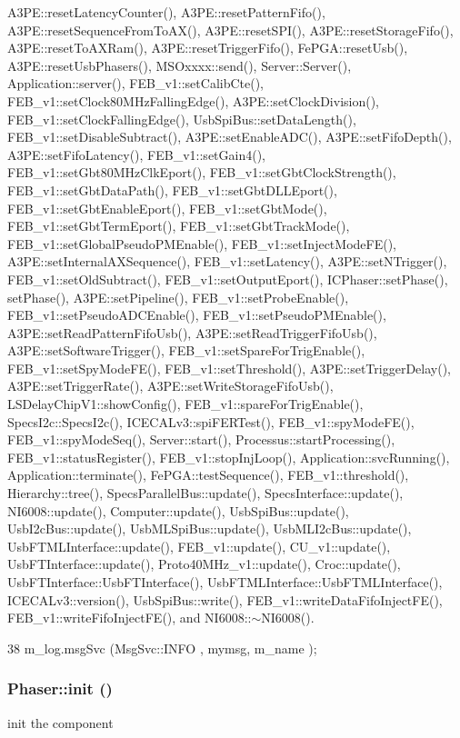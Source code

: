 A3PE::resetLatencyCounter(), A3PE::resetPatternFifo(), A3PE::resetSequenceFromToAX(), A3PE::resetSPI(), A3PE::resetStorageFifo(), A3PE::resetToAXRam(), A3PE::resetTriggerFifo(), FePGA::resetUsb(), A3PE::resetUsbPhasers(), MSOxxxx::send(), Server::Server(), Application::server(), FEB\_\-v1::setCalibCte(), FEB\_\-v1::setClock80MHzFallingEdge(), A3PE::setClockDivision(), FEB\_\-v1::setClockFallingEdge(), UsbSpiBus::setDataLength(), FEB\_\-v1::setDisableSubtract(), A3PE::setEnableADC(), A3PE::setFifoDepth(), A3PE::setFifoLatency(), FEB\_\-v1::setGain4(), FEB\_\-v1::setGbt80MHzClkEport(), FEB\_\-v1::setGbtClockStrength(), FEB\_\-v1::setGbtDataPath(), FEB\_\-v1::setGbtDLLEport(), FEB\_\-v1::setGbtEnableEport(), FEB\_\-v1::setGbtMode(), FEB\_\-v1::setGbtTermEport(), FEB\_\-v1::setGbtTrackMode(), FEB\_\-v1::setGlobalPseudoPMEnable(), FEB\_\-v1::setInjectModeFE(), A3PE::setInternalAXSequence(), FEB\_\-v1::setLatency(), A3PE::setNTrigger(), FEB\_\-v1::setOldSubtract(), FEB\_\-v1::setOutputEport(), ICPhaser::setPhase(), setPhase(), A3PE::setPipeline(), FEB\_\-v1::setProbeEnable(), FEB\_\-v1::setPseudoADCEnable(), FEB\_\-v1::setPseudoPMEnable(), A3PE::setReadPatternFifoUsb(), A3PE::setReadTriggerFifoUsb(), A3PE::setSoftwareTrigger(), FEB\_\-v1::setSpareForTrigEnable(), FEB\_\-v1::setSpyModeFE(), FEB\_\-v1::setThreshold(), A3PE::setTriggerDelay(), A3PE::setTriggerRate(), A3PE::setWriteStorageFifoUsb(), LSDelayChipV1::showConfig(), FEB\_\-v1::spareForTrigEnable(), SpecsI2c::SpecsI2c(), ICECALv3::spiFERTest(), FEB\_\-v1::spyModeFE(), FEB\_\-v1::spyModeSeq(), Server::start(), Processus::startProcessing(), FEB\_\-v1::statusRegister(), FEB\_\-v1::stopInjLoop(), Application::svcRunning(), Application::terminate(), FePGA::testSequence(), FEB\_\-v1::threshold(), Hierarchy::tree(), SpecsParallelBus::update(), SpecsInterface::update(), NI6008::update(), Computer::update(), UsbSpiBus::update(), UsbI2cBus::update(), UsbMLSpiBus::update(), UsbMLI2cBus::update(), UsbFTMLInterface::update(), FEB\_\-v1::update(), CU\_\-v1::update(), UsbFTInterface::update(), Proto40MHz\_\-v1::update(), Croc::update(), UsbFTInterface::UsbFTInterface(), UsbFTMLInterface::UsbFTMLInterface(), ICECALv3::version(), UsbSpiBus::write(), FEB\_\-v1::writeDataFifoInjectFE(), FEB\_\-v1::writeFifoInjectFE(), and NI6008::$\sim$NI6008().


\begin{DoxyCode}
38 { m_log.msgSvc (MsgSvc::INFO    , mymsg, m_name ); }
\end{DoxyCode}
\hypertarget{classPhaser_a4691b8963a099f8a75475eb9be47a309}{
\subsubsection[{init}]{ Phaser::init ()}}
\label{classPhaser_a4691b8963a099f8a75475eb9be47a309}
init the component

